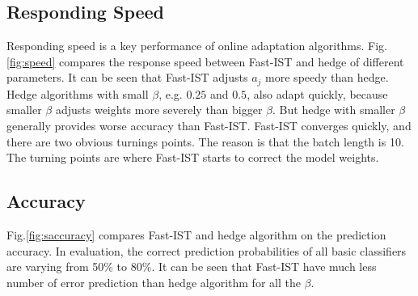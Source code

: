 \documentclass[letterpaper]{article}
\begin{document}
\subsection{Responding Speed}
Responding speed is a key performance of online adaptation algorithms.
Fig.\ref{fig:speed} compares the response speed between Fast-IST and hedge of different parameters. It can be seen that Fast-IST adjusts $a_j$ more speedy than hedge. Hedge algorithms with small $\beta$, e.g. $0.25$ and $0.5$, also adapt quickly, because smaller $\beta$ adjusts weights more severely than bigger $\beta$. But hedge with smaller $\beta$ generally provides worse accuracy than Fast-IST. Fast-IST converges quickly, and there are  two obvious turnings points. The reason is that the batch length is 10. The turning points are where Fast-IST starts to correct the model weights.

\subsection{Accuracy}

Fig.\ref{fig:saccuracy} compares Fast-IST and hedge algorithm on the prediction accuracy. %
In evaluation, the correct prediction probabilities of all basic classifiers are varying from 50\% to 80\%.
It can be seen that Fast-IST have much less number of error prediction than hedge algorithm for all the $\beta$.
\end{document}
